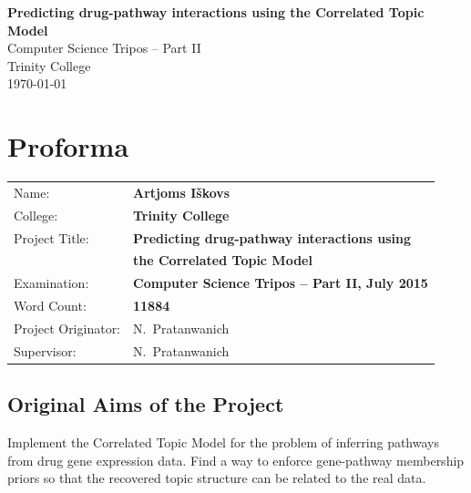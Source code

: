 \documentclass[12pt,a4paper,twoside,openright]{report}
\begin{document}


\pagestyle{empty}


\vspace*{60mm}
\begin{center}
\Huge
\textbf{Predicting drug-pathway interactions using the Correlated Topic Model} \\[5mm]
Computer Science Tripos -- Part II \\[5mm]
Trinity College \\[5mm]
\today  %
\end{center}


\pagestyle{plain}

\chapter*{Proforma}

{\large
\begin{tabular}{ll}
Name:               & \bf Artjoms I\v{s}kovs                       \\
College:            & \bf Trinity College                     \\
Project Title:     & \bf Predicting drug-pathway interactions using \\ & \bf the Correlated Topic Model\\
Examination:        & \bf Computer Science Tripos -- Part II, July 2015  \\
Word Count:         & \bf 11884\\
Project Originator: & N.~Pratanwanich                    \\
Supervisor:         & N.~Pratanwanich                    \\ 
\end{tabular}
}

\section*{Original Aims of the Project}
Implement the Correlated Topic Model for the problem of inferring pathways from drug gene expression data. Find a way to enforce gene-pathway membership priors so that the recovered topic structure can be related to the real data.
\end{document}
